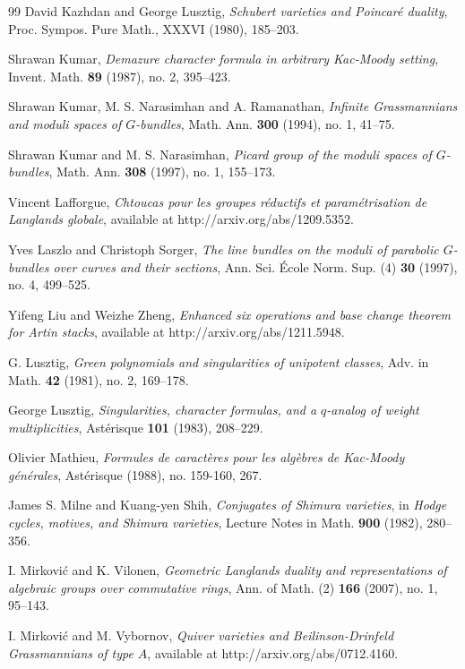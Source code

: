\begin{thebibliography}{99}
 David Kazhdan and George Lusztig, \emph{Schubert varieties and Poincar\'e duality}, Proc. Sympos. Pure Math., XXXVI (1980), 185--203.

 Shrawan Kumar, \emph{Demazure character formula in arbitrary Kac-Moody setting}, Invent. Math. \textbf{89} (1987), no. 2, 395--423.

 Shrawan Kumar, M. S. Narasimhan and A. Ramanathan, \emph{Infinite Grassmannians and moduli spaces of $G$-bundles}, Math. Ann. \textbf{300} (1994), no. 1, 41--75.

 Shrawan Kumar and M. S. Narasimhan, \emph{Picard group of the moduli spaces of $G$-bundles}, Math. Ann. \textbf{308} (1997), no. 1, 155--173.

 Vincent Lafforgue, \emph{Chtoucas pour les groupes r\'{e}ductifs et param\'{e}trisation de Langlands globale}, available at http://arxiv.org/abs/1209.5352.

 Yves Laszlo and Christoph Sorger, \emph{The line bundles on the moduli of parabolic $G$-bundles over curves and their sections}, Ann. Sci. \'Ecole Norm. Sup. (4) \textbf{30} (1997), no. 4, 499--525.

 Yifeng Liu and Weizhe Zheng, \emph{Enhanced six operations and base change theorem for Artin stacks}, available at http://arxiv.org/abs/1211.5948.

 G. Lusztig, \emph{Green polynomials and singularities of unipotent classes}, Adv. in Math. \textbf{42} (1981), no. 2, 169--178.

 George Lusztig, \emph{Singularities, character formulas, and a $q$-analog of weight multiplicities}, Ast\'erisque \textbf{101} (1983), 208--229.

 Olivier Mathieu, \emph{Formules de caract\`eres pour les alg\`ebres de Kac-Moody g\'en\'erales}, Ast\'erisque (1988), no. 159-160, 267.

 James S. Milne and Kuang-yen Shih, \emph{Conjugates of Shimura varieties}, in \emph{Hodge cycles, motives, and Shimura varieties}, Lecture Notes in Math. \textbf{900} (1982), 280--356.

 I. Mirkovi{\'c} and K. Vilonen, \emph{Geometric Langlands duality and representations of algebraic groups over commutative rings}, Ann. of Math. (2) \textbf{166} (2007), no. 1, 95--143.

 I. Mirkovi\'c and M. Vybornov, \emph{Quiver varieties and Beilinson-Drinfeld Grassmannians of type $A$}, available at http://arxiv.org/abs/0712.4160.


\end{thebibliography}
